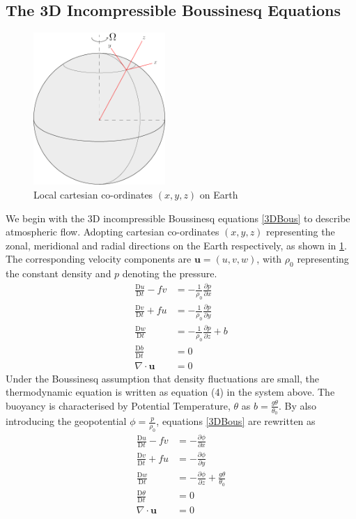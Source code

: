 \subsection{The 3D Incompressible Boussinesq Equations}
\begin{figure}[h]	
	\centering
	\includegraphics[width=5cm]{background/local_cartesian}
	\caption{Local cartesian co-ordinates $\left(x,y,z\right)$ on Earth}
	\label{fig:localcartesian}
\end{figure}
We begin with the $3$D incompressible Boussinesq equations \ref{3DBous} to describe atmospheric flow. Adopting cartesian co-ordinates $\left(x,y,z\right)$ representing the zonal, meridional and radial directions on the Earth respectively, as shown in \ref{fig:localcartesian}. The corresponding velocity components are $\bm{u}=\left(u,v,w\right)$, with $\rho_0$ representing the constant density and $p$ denoting the pressure.
\begin{equation}
	\begin{aligned}
		\frac{\mathrm{D}u}{\mathrm{D}t}	- fv  &= -\frac{1}{\rho_0}\frac{\partial p}{\partial x}\\
		\frac{\mathrm{D}v}{\mathrm{D}t}	+ fu  &= -\frac{1}{\rho_0}\frac{\partial p}{\partial y}\\
		\frac{\mathrm{D}w}{\mathrm{D}t} &= -\frac{1}{\rho_0}\frac{\partial p}{\partial z} + b\\
		\frac{\mathrm{D} b}{\mathrm{D}t} &= 0\\
		\nabla \cdot \bm{u} &= 0
	\end{aligned}
\label{3DBous}
\end{equation}
Under the Boussinesq assumption that density fluctuations are small, the thermodynamic equation is written as equation (4) in the system above. The buoyancy is characterised by Potential Temperature, $\theta$ as $b = \frac{g\theta}{\theta_0}$. By also introducing the geopotential $\phi = \frac{p}{\rho_0}$, equations \ref{3DBous} are rewritten as
\begin{equation}
	\begin{aligned}
		\frac{\mathrm{D}u}{\mathrm{D}t}	- fv  &= -\frac{\partial \phi}{\partial x}\\
		\frac{\mathrm{D}v}{\mathrm{D}t}	+ fu  &= -\frac{\partial \phi}{\partial y}\\
		\frac{\mathrm{D}w}{\mathrm{D}t} &= -\frac{\partial \phi}{\partial z} + \frac{g\theta}{\theta_0}\\
		\frac{\mathrm{D} \theta}{\mathrm{D}t} &= 0\\
		\nabla \cdot \bm{u} &= 0
	\end{aligned}
\label{3DBousPT}
\end{equation}
